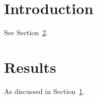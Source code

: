 \documentclass{article}
\begin{document}
\section{Introduction}\label{sec:intro}
See Section~\ref{sec:results}.

\section{Results}\label{sec:results}
As discussed in Section~\ref{sec:intro}.
\end{document}
